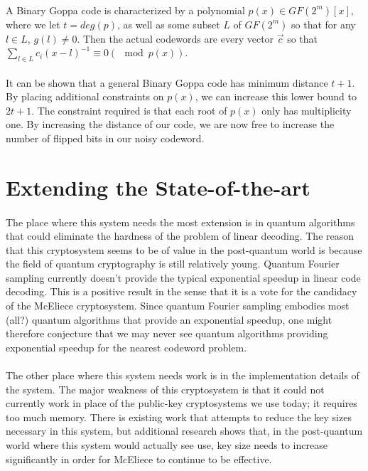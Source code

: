 \documentclass[12pt]{article}
\theoremstyle{definition}
\begin{document}
\paragraph{}
A Binary Goppa code is characterized by a polynomial $p(x) \in GF(2^m)[x]$, where we let $t = deg(p)$, as well as some subset $L$ of $GF(2^m)$ so that for any $l\in L$, $g(l) \not = 0$. Then the actual codewords are every vector $\vec{c}$ so that $\sum_{l\in L} c_i (x-l)^{-1} \equiv 0 (\mod p(x))$. 

\paragraph{}
It can be shown that a general Binary Goppa code has minimum distance $t+1$. By placing additional constraints on $p(x)$, we can increase this lower bound to $2t+1$. The constraint required is that each root of $p(x)$ only has multiplicity one. By increasing the distance of our code, we are now free to increase the number of flipped bits in our noisy codeword.


\section{Extending the State-of-the-art}
\paragraph{} 
The place where this system needs the most extension is in quantum algorithms that could eliminate the hardness of the problem of linear decoding. The reason that this cryptosystem seems to be of value in the post-quantum world is because the field of quantum cryptography is still relatively young. Quantum Fourier sampling currently doesn't provide the typical exponential speedup in linear code decoding. This is a positive result in the sense that it is a vote for the candidacy of the McEliece cryptosystem. Since quantum Fourier sampling embodies most (all?) quantum algorithms that provide an exponential speedup, one might therefore conjecture that we may never see quantum algorithms providing exponential speedup for the nearest codeword problem. 
\paragraph{} 
The other place where this system needs work is in the implementation details of the system.  The major weakness of this cryptosystem is that it could not currently work in place of the public-key cryptosystems we use today; it requires too much memory. There is existing work that attempts to reduce the key sizes necessary in this system, but additional research shows that, in the post-quantum world where this system would actually see use, key size needs to increase significantly in order for McEliece to continue to be effective.
\end{document}
